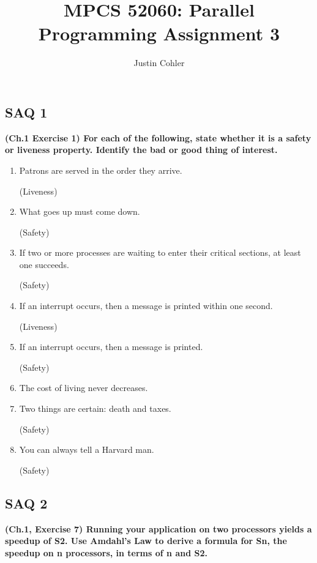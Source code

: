 \documentclass[12pt]{article}
\begin{document}
\title{MPCS 52060: Parallel Programming Assignment 3}
\author{Justin Cohler}

\maketitle

\subsection*{SAQ 1} 
\textbf{(Ch.1 Exercise 1) For each of the following, state whether it is a safety or liveness property. Identify the bad or good thing of interest.}

\begin{enumerate}
    \item Patrons are served in the order they arrive.

    (Liveness)
    \item What goes up must come down.
    
    (Safety)
    \item If two or more processes are waiting to enter their critical sections, at least one succeeds.
    
    (Safety)
   \item If an interrupt occurs, then a message is printed within one second. 
   
   (Liveness)
   \item If an interrupt occurs, then a message is printed.
    
    (Safety)
    \item The cost of living never decreases.
    
    
    \item Two things are certain: death and taxes.
    
    (Safety)
    \item You can always tell a Harvard man.
    
    (Safety)
\end{enumerate}

\vspace{5mm}

\subsection*{SAQ 2}
\textbf{(Ch.1, Exercise 7) Running your application on two processors yields a speedup of S2. Use Amdahl’s Law to derive a formula for Sn, the speedup on n processors, in terms of n and S2.
}
\end{document}
